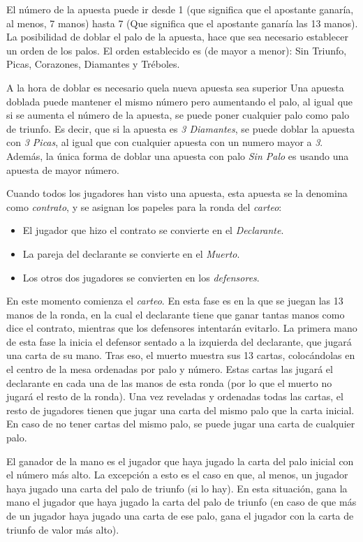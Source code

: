 El número de la apuesta puede ir desde 1 (que significa que el apostante ganaría, al menos, 7 manos) hasta 7 (Que significa que el apostante ganaría las 13 manos).
La posibilidad de doblar el palo de la apuesta, hace que sea necesario establecer un orden de los palos.  El orden establecido es (de mayor a menor): Sin Triunfo, Picas, Corazones, Diamantes y Tréboles. 

A la hora de doblar es necesario quela nueva apuesta sea superior Una apuesta doblada puede mantener el mismo número pero aumentando el palo, al igual que si se aumenta el número de la apuesta, se puede poner cualquier palo como palo de triunfo. Es decir, que si la apuesta es  \textit{3 Diamantes}, se puede doblar la apuesta con  \textit{3 Picas}, al igual que con cualquier apuesta con un numero mayor a \textit{3}. Además, la única forma de doblar una apuesta con palo \textit{Sin Palo} es usando una apuesta de mayor número.\cite{bridge}

Cuando todos los jugadores han visto una apuesta, esta apuesta se la denomina como \textit{contrato}, y se asignan los papeles para la ronda del \textit{carteo}:
\begin{itemize}
\item El jugador que hizo el contrato se convierte en el  \textit{Declarante}.
\item La pareja del declarante se convierte en el \textit{Muerto}.
\item Los otros dos jugadores se convierten en los \textit{defensores}.
\end{itemize} 

En este momento comienza el \textit{carteo}. En esta fase es en la que se juegan las 13 manos de la ronda, en la cual el declarante tiene que ganar tantas manos como dice el contrato, mientras que los defensores intentarán evitarlo. 
La primera mano de esta fase la inicia el defensor sentado a la izquierda del declarante, que jugará una carta de su mano. Tras eso, el muerto muestra sus 13 cartas, colocándolas en el centro de la mesa ordenadas por palo y número. Estas cartas las jugará el declarante en cada una de las manos de esta ronda (por lo que el muerto no jugará el resto de la ronda). Una vez reveladas y ordenadas todas las cartas, el resto de jugadores tienen que jugar una carta del mismo palo que la carta inicial. En caso de no tener cartas del mismo palo, se puede jugar una carta de cualquier palo. \cite{bridge}

El ganador de la mano es el jugador que haya jugado la carta del palo inicial con el número más alto. La excepción a esto es el caso en que, al menos, un jugador haya jugado una carta del palo de triunfo (si lo hay). En esta situación, gana la mano el jugador que haya jugado la carta del palo de triunfo (en caso de que más de un jugador haya jugado una carta de ese palo, gana el jugador con la carta de triunfo de valor más alto).


